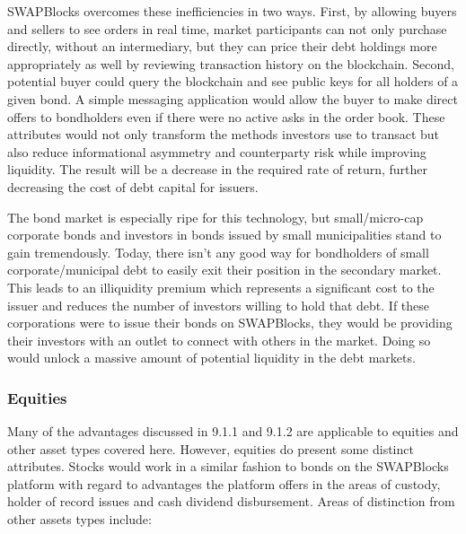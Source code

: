 \documentclass[12pt]{article}
\begin{document}
SWAPBlocks overcomes these inefficiencies in two ways. First, by allowing buyers and sellers to see orders in real time, 
market participants can not only purchase directly, without an intermediary, but they can price their debt holdings more 
appropriately as well by reviewing transaction history on the blockchain. Second, potential buyer could query the blockchain 
and see public keys for all holders of a given bond. 
A simple messaging application would allow the buyer to make direct offers to bondholders even if there were no active asks in 
the order book. These attributes would not only transform the methods investors use to transact but also reduce informational 
asymmetry and counterparty risk while improving liquidity. The result will be a decrease in the required rate of return, 
further decreasing the cost of debt capital for issuers.

The bond market is especially ripe for this technology, but small/micro-cap corporate bonds and investors in bonds issued by small
municipalities stand to gain 
tremendously. Today, there isn’t any good way for bondholders of small corporate/municipal debt to easily exit their position 
in the secondary market. This leads to an illiquidity premium which represents a significant cost to the issuer and 
reduces the number of investors willing to hold that debt. If these corporations were to issue their bonds on SWAPBlocks, 
they would be providing their investors with an outlet to connect with others in the market. Doing so would unlock a 
massive amount of potential liquidity in the debt markets.

\subsubsection{Equities}
Many of the advantages discussed in 9.1.1 and 9.1.2 are applicable to equities and other asset types covered here. 
However, equities do present some distinct attributes. Stocks would work in a similar fashion to bonds on the SWAPBlocks 
platform with regard to advantages the platform offers in the areas of custody, holder of record issues and cash 
dividend disbursement. Areas of distinction from other assets types include:
\end{document}
